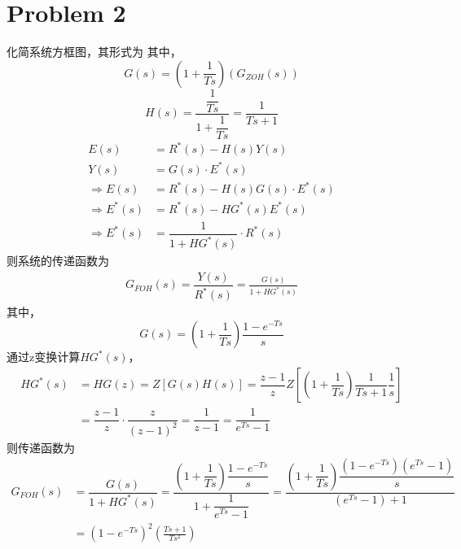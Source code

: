 \documentclass{myrep}
\begin{document}
\section*{Problem 2}
化简系统方框图，其形式为
其中，
\begin{equation}
	G(s) = (1 + \dfrac{1}{Ts})(G_{ZOH}(s))
\end{equation}
\begin{equation}
	H(s) = \dfrac{\dfrac{1}{Ts}}{1+\dfrac{1}{Ts}} = \dfrac{1}{Ts + 1}
\end{equation}
\begin{align}
	E(s) & = R^*(s) - H(s)Y(s)\\
	Y(s) & = G(s)\cdot E^*(s)\\
	\Rightarrow E(s) & = R^*(s) - H(s)G(s)\cdot E^*(s)\\
	\Rightarrow E^*(s) &= R^*(s) - HG^*(s)E^*(s) \\
	\Rightarrow E^*(s) &= \dfrac{1}{1 + HG^*(s)}\cdot R^*(s)
\end{align}
则系统的传递函数为
\begin{align}
	G_{FOH}(s) = \dfrac{Y(s)}{R^*(s)} = \frac{G(s)}{1 + HG^*(s)}
\end{align}
其中，
\begin{equation}
	G(s) = (1 + \dfrac{1}{Ts})\dfrac{1-e^{-Ts}}{s}
\end{equation}
通过z变换计算$HG^*(s)$，
\begin{align}
	HG^*(s) & = HG(z) = Z\left[G(s)H(s)\right] = \dfrac{z-1}{z}Z\left[(1 + \dfrac{1}{Ts})\dfrac{1}{Ts + 1} \dfrac{1}{s}\right]\\
	& = \dfrac{z-1}{z}\cdot \dfrac{z}{(z-1)^2} = \dfrac{1}{z-1} = \dfrac{1}{e^{Ts}-1}
\end{align}
则传递函数为
\begin{align}
	G_{FOH}(s) &= \dfrac{G(s)}{1 + HG^*(s)} = \dfrac{(1 + \dfrac{1}{Ts})\dfrac{1-e^{-Ts}}{s}}{1 + \dfrac{1}{e^{Ts}-1}} =  \dfrac{(1 + \dfrac{1}{Ts})\dfrac{(1-e^{-Ts})(e^{Ts}-1)}{s}}{(e^{Ts}-1)+1}\\
	& = (1-e^{-Ts})^2\left(\frac{Ts+1}{Ts^2}\right)
\end{align}


\end{document}
